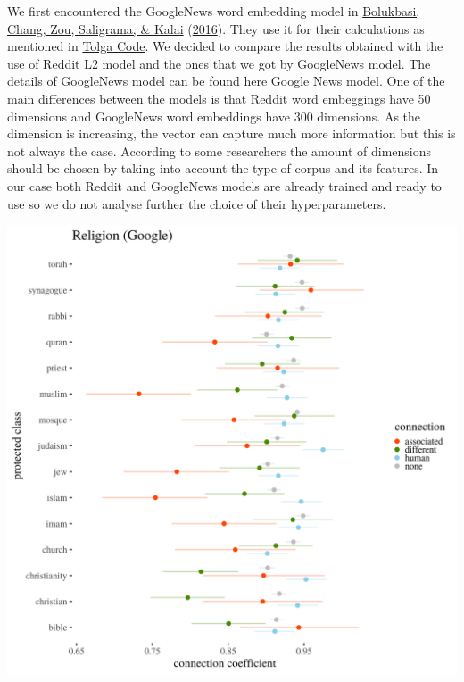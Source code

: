 \documentclass[
  12pt,
]{book}
\begin{document}
We first encountered the GoogleNews word embedding model in \protect\hyperlink{ref-Bolukbasi2016Man}{Bolukbasi, Chang, Zou, Saligrama, \& Kalai} (\protect\hyperlink{ref-Bolukbasi2016Man}{2016}). They use it for their calculations as mentioned in \href{https://github.com/tolga-b/debiaswe}{Tolga Code}. We decided to compare the results obtained with the use of Reddit L2 model and the ones that we got by GoogleNews model. The details of GoogleNews model can be found here \href{https://code.google.com/archive/p/word2vec/}{Google News model}. One of the main differences between the models is that Reddit word embeggings have 50 dimensions and GoogleNews word embeddings have 300 dimensions. As the dimension is increasing, the vector can capture much more information but this is not always the case. According to some researchers the amount of dimensions should be chosen by taking into account the type of corpus and its features. In our case both Reddit and GoogleNews models are already trained and ready to use so we do not analyse further the choice of their hyperparameters.

\includegraphics[width=14cm]{../images/visReligionGoogle.png}
\end{document}
